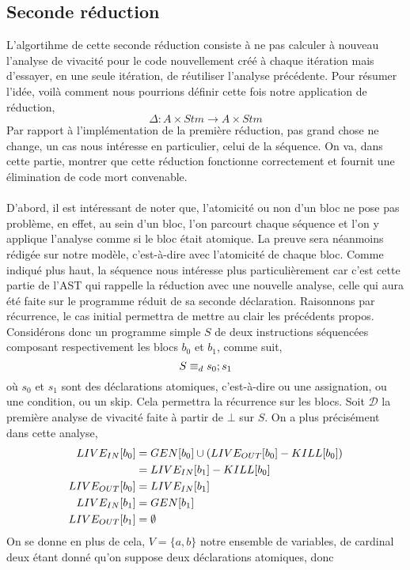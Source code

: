 \documentclass[a4paper, 12pt]{article}
\begin{document}
\subsection{Seconde réduction}
L'algortihme de cette seconde réduction consiste à ne pas calculer à nouveau l'analyse de vivacité pour le
code nouvellement créé à chaque itération mais d'essayer, en une seule itération, de réutiliser l'analyse précédente.
Pour résumer l'idée, voilà comment nous pourrions définir cette fois notre application de réduction,
\[\Delta : A \times Stm \longrightarrow A \times Stm \]
Par rapport à l'implémentation de la première réduction, pas grand chose ne change, un cas nous intéresse en particulier,
celui de la séquence. On va, dans cette partie, montrer que cette réduction fonctionne correctement et fournit une
élimination de code mort convenable.
\\
\\
D'abord, il est intéressant de noter que, l'atomicité ou non d'un bloc ne pose pas problème, en effet, au sein d'un bloc,
l'on parcourt chaque séquence et l'on y applique l'analyse comme si le bloc était atomique. La preuve sera néanmoins rédigée
sur notre modèle, c'est-à-dire avec l'atomicité de chaque bloc.
Comme indiqué plus haut, la séquence nous intéresse plus particulièrement car c'est cette partie de l'AST qui rappelle la réduction
avec une nouvelle analyse, celle qui aura été faite sur le programme réduit de sa seconde déclaration. Raisonnons par récurrence, le cas
initial permettra de mettre au clair les précédents propos. Considérons donc un programme simple $S$ de deux instructions séquencées
composant respectivement les blocs $b_0$ et $b_1$, comme suit,
\[S \equiv_d {s_0}\space;\space{s_1}\]
où $s_0$ et $s_1$ sont des déclarations atomiques, c'est-à-dire ou une assignation, ou une condition, ou un skip. Cela permettra la récurrence
sur les blocs. Soit $\mathcal{D}$ la première analyse de vivacité faite à partir de $\bot$ sur $S$. On a plus précisément dans cette analyse,
\begin{align*}
	LIVE_{IN}[b_0] 	&= GEN[b_0] \cup (LIVE_{OUT}[b_0] - KILL[b_0])\\ 
					&= LIVE_{IN}[b_1] - KILL[b_0]\\
	LIVE_{OUT}[b_0] 	&= LIVE_{IN}[b_1]\\
	LIVE_{IN}[b_1] 	&= GEN[b_1]\\
	LIVE_{OUT}[b_1] 	&= \emptyset
\end{align*}
On se donne en plus de cela, $V = \{a, b\}$ notre ensemble de variables, de cardinal deux étant donné qu'on suppose deux déclarations atomiques, donc
\end{document}
